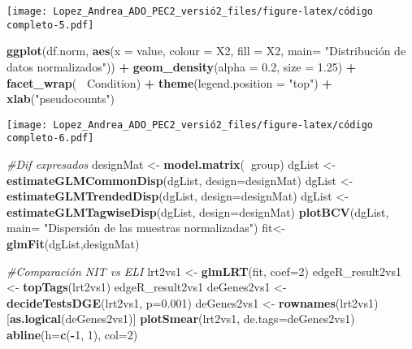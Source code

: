 \documentclass[
]{article}
\newenvironment{Shaded}{\begin{snugshade}}{\end{snugshade}}
\newcommand{\CommentTok}[1]{\textcolor[rgb]{0.56,0.35,0.01}{\textit{#1}}}
\newcommand{\DataTypeTok}[1]{\textcolor[rgb]{0.13,0.29,0.53}{#1}}
\newcommand{\DecValTok}[1]{\textcolor[rgb]{0.00,0.00,0.81}{#1}}
\newcommand{\FloatTok}[1]{\textcolor[rgb]{0.00,0.00,0.81}{#1}}
\newcommand{\KeywordTok}[1]{\textcolor[rgb]{0.13,0.29,0.53}{\textbf{#1}}}
\newcommand{\NormalTok}[1]{#1}
\newcommand{\OperatorTok}[1]{\textcolor[rgb]{0.81,0.36,0.00}{\textbf{#1}}}
\newcommand{\StringTok}[1]{\textcolor[rgb]{0.31,0.60,0.02}{#1}}
\begin{document}
\texttt{[image: Lopez\_Andrea\_ADO\_PEC2\_versió2\_files/figure-latex/código completo-5.pdf]}

\begin{Shaded}
\begin{Highlighting}[]
\KeywordTok{ggplot}\NormalTok{(df.norm, }\KeywordTok{aes}\NormalTok{(}\DataTypeTok{x =}\NormalTok{ value, }\DataTypeTok{colour =}\NormalTok{ X2, }\DataTypeTok{fill =}\NormalTok{ X2, }\DataTypeTok{main=} \StringTok{"Distribución de datos normalizados"}\NormalTok{)) }\OperatorTok{+}
\KeywordTok{geom_density}\NormalTok{(}\DataTypeTok{alpha =} \FloatTok{0.2}\NormalTok{, }\DataTypeTok{size =} \FloatTok{1.25}\NormalTok{) }\OperatorTok{+}\StringTok{ }\KeywordTok{facet_wrap}\NormalTok{(}\OperatorTok{~}\StringTok{ }\NormalTok{Condition) }\OperatorTok{+}
\KeywordTok{theme}\NormalTok{(}\DataTypeTok{legend.position =} \StringTok{"top"}\NormalTok{) }\OperatorTok{+}\StringTok{ }\KeywordTok{xlab}\NormalTok{(}\StringTok{"pseudocounts"}\NormalTok{)}
\end{Highlighting}
\end{Shaded}

\texttt{[image: Lopez\_Andrea\_ADO\_PEC2\_versió2\_files/figure-latex/código completo-6.pdf]}

\begin{Shaded}
\begin{Highlighting}[]
\CommentTok{#Dif expresados}
\NormalTok{designMat <-}\StringTok{ }\KeywordTok{model.matrix}\NormalTok{(}\OperatorTok{~}\NormalTok{group)}
\NormalTok{dgList <-}\StringTok{ }\KeywordTok{estimateGLMCommonDisp}\NormalTok{(dgList, }\DataTypeTok{design=}\NormalTok{designMat)}
\NormalTok{dgList <-}\StringTok{ }\KeywordTok{estimateGLMTrendedDisp}\NormalTok{(dgList, }\DataTypeTok{design=}\NormalTok{designMat)}
\NormalTok{dgList <-}\StringTok{ }\KeywordTok{estimateGLMTagwiseDisp}\NormalTok{(dgList, }\DataTypeTok{design=}\NormalTok{designMat)}
\KeywordTok{plotBCV}\NormalTok{(dgList, }\DataTypeTok{main=} \StringTok{"Dispersión de las muestras normalizadas"}\NormalTok{)}
\NormalTok{fit<-}\KeywordTok{glmFit}\NormalTok{(dgList,designMat)}

\CommentTok{#Comparación NIT vs ELI}
\NormalTok{lrt2vs1 <-}\StringTok{ }\KeywordTok{glmLRT}\NormalTok{(fit, }\DataTypeTok{coef=}\DecValTok{2}\NormalTok{)}
\NormalTok{edgeR_result2vs1 <-}\StringTok{ }\KeywordTok{topTags}\NormalTok{(lrt2vs1)}
\NormalTok{edgeR_result2vs1}
\NormalTok{deGenes2vs1 <-}\StringTok{ }\KeywordTok{decideTestsDGE}\NormalTok{(lrt2vs1, }\DataTypeTok{p=}\FloatTok{0.001}\NormalTok{)}
\NormalTok{deGenes2vs1 <-}\StringTok{ }\KeywordTok{rownames}\NormalTok{(lrt2vs1)[}\KeywordTok{as.logical}\NormalTok{(deGenes2vs1)]}
\KeywordTok{plotSmear}\NormalTok{(lrt2vs1, }\DataTypeTok{de.tags=}\NormalTok{deGenes2vs1)}
\KeywordTok{abline}\NormalTok{(}\DataTypeTok{h=}\KeywordTok{c}\NormalTok{(}\OperatorTok{-}\DecValTok{1}\NormalTok{, }\DecValTok{1}\NormalTok{), }\DataTypeTok{col=}\DecValTok{2}\NormalTok{)}
\end{Highlighting}
\end{Shaded}
\end{document}
